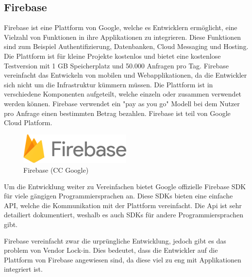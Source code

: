﻿\subsection{Firebase}

Firebase ist eine Plattform von Google, welche es Entwicklern ermöglicht, eine Vielzahl von Funktionen in ihre Applikationen zu integrieren. Diese Funktionen sind zum Beispiel Authentifizierung, Datenbanken, Cloud Messaging und Hosting. Die Plattform ist für kleine Projekte kostenlos und bietet eine kostenlose Testversion mit 1 GB Speicherplatz und 50.000 Anfragen pro Tag. Firebase vereinfacht das Entwickeln von mobilen und Webapplikationen, da die Entwickler sich nicht um die Infrastruktur kümmern müssen. Die Plattform ist in verschiedene Komponenten aufgeteilt, welche einzeln oder zusammen verwendet werden können. Firebase verwendet ein "pay as you go" Modell bei dem Nutzer pro Anfrage einen bestimmten Betrag bezahlen. Firebase ist teil von Google Cloud Platform.

\begin{figure}[h]
  \centering
  \includegraphics[width=0.5\textwidth]{images/firebase_logo}
  \caption{Firebase (CC Google)}
  \label{fig:firebase_logo}
\end{figure}

Um die Entwicklung weiter zu Vereinfachen bietet Google offizielle Firebase \ac{SDK} für viele gängigen Programmiersprachen an. Diese SDKs bieten eine einfache \ac{API}, welche die Kommunikation mit der Plattform vereinfacht. Die Api ist sehr detailiert dokumentiert, weshalb es auch SDKs für andere Programmiersprachen gibt.

Firebase vereinfacht zwar die urprüngliche Entwicklung, jedoch gibt es das problem von Vendor Lock-in. Dies bedeutet, dass die Entwickler auf die Plattform von Firebase angewiesen sind, da diese viel zu eng mit Applikationen integriert ist.
